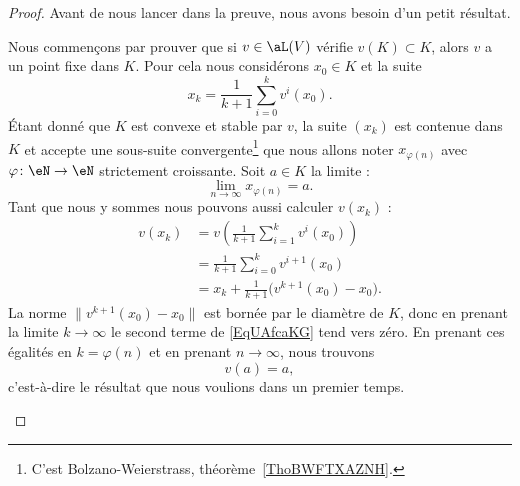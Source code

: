 \begin{proof}
	Avant de nous lancer dans la preuve, nous avons besoin d'un petit résultat.
	\begin{subproof}

		Nous commençons par prouver que si \( v\in \aL(V)\) vérifie \( v(K)\subset K\), alors \( v\) a un point fixe dans \( K\). Pour cela nous considérons \( x_0\in K\) et la suite
		\begin{equation}
			x_k=\frac{1}{ k+1 }\sum_{i=0}^kv^i(x_0).
		\end{equation}
		Étant donné que \( K\) est convexe et stable par \( v\), la suite \( (x_k)\) est contenue dans \( K\) et accepte une sous-suite convergente\footnote{C'est Bolzano-Weierstrass, théorème~\ref{ThoBWFTXAZNH}.} que nous allons noter \( x_{\varphi(n)}\) avec \( \varphi\colon \eN\to \eN\) strictement croissante. Soit \( a\in K\) la limite :
		\begin{equation}
			\lim_{n\to \infty} x_{\varphi(n)}=a.
		\end{equation}
		Tant que nous y sommes nous pouvons aussi calculer \( v(x_k)\) :
		\begin{subequations}
			\begin{align}
				v(x_k) & =v\left( \frac{1}{ k+1 }\sum_{i=1}^kv^i(x_0) \right)                     \\
				       & =\frac{1}{ k+1 }\sum_{i=0}^kv^{i+1}(x_0)                                 \\
				       & =x_k+\frac{1}{ k+1 }\Big( v^{k+1}(x_0)-x_0 \Big).      \label{EqUAfcaKG}
			\end{align}
		\end{subequations}
		La norme \( \| v^{k+1}(x_0)-x_0 \|\) est bornée par le diamètre de \( K\), donc en prenant la limite \( k\to \infty\) le second terme de \eqref{EqUAfcaKG} tend vers zéro. En prenant ces égalités en \( k=\varphi(n)\) et en prenant \( n\to\infty\), nous trouvons
		\begin{equation}
			v(a)=a,
		\end{equation}
		c'est-à-dire le résultat que nous voulions dans un premier temps.



\end{subproof}
\end{proof}
